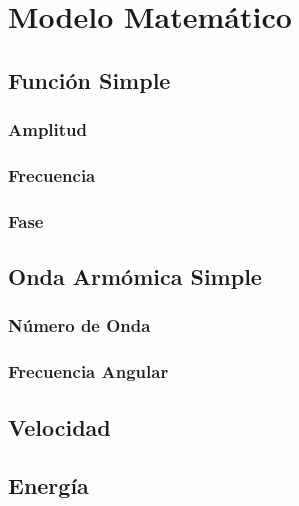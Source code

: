 \chapter{Modelo Matemático}%
\section{Función Simple}%

\subsection{Amplitud}

\subsection{Frecuencia}

\subsection{Fase}

\section{Onda Armómica Simple}

\subsection{Número de Onda}

\subsection{Frecuencia Angular}

\section{Velocidad}

\section{Energía}


